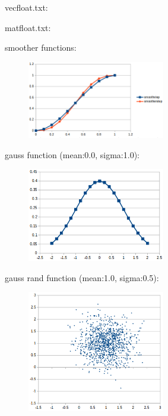 \documentclass[12pt, a4paper]{article}
\begin{document}
vecfloat.txt:\\
\begin{scriptsize}
\begin{ttfamily}

\end{ttfamily}
\end{scriptsize}

matfloat.txt:\\
\begin{scriptsize}
\begin{ttfamily}

\end{ttfamily}
\end{scriptsize}

smoother functions:\\
\begin{center}
\begin{figure}[H]
\centering\includegraphics[width=6cm]{./smoother.png}\\
\end{figure}
\end{center}

gauss function (mean:0.0, sigma:1.0):\\
\begin{center}
\begin{figure}[H]
\centering\includegraphics[width=6cm]{./gauss.png}\\
\end{figure}
\end{center}

gauss rand function (mean:1.0, sigma:0.5):\\
\begin{center}
\begin{figure}[H]
\centering\includegraphics[width=6cm]{./gaussrnd.png}\\
\end{figure}
\end{center}
\end{document}
